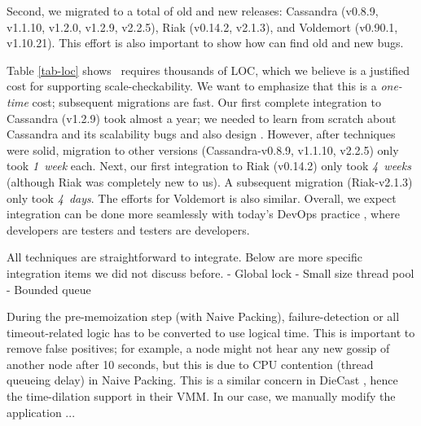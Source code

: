 Second, we migrated \sck to a total of \numVers old and new releases:
%
\numVersCass Cassandra (v0.8.9, v1.1.10, v1.2.0, v1.2.9, v2.2.5),
%
\numVersRiak Riak (v0.14.2, v2.1.3), and
%
\numVersVold Voldemort (v0.90.1, v1.10.21).
%
This effort is also important to show how \sck can find old and new
bugs. 



%
Table \ref{tab-loc} shows \sck\ requires thousands of LOC, which we
believe is a justified cost for supporting scale-checkability.  We want to
emphasize that this is a {\em one-time} cost; subsequent migrations are
fast.  Our first complete integration to Cassandra (v1.2.9) took almost a
year; we needed to learn from scratch about Cassandra and its scalability
bugs and also design \sck.  However, after \sck techniques were solid,
migration to other versions (Cassandra-v0.8.9, v1.1.10, v2.2.5) only took
{\em 1~week} each.  Next, our first integration to Riak (v0.14.2) only
took {\em 4~weeks} (although Riak was completely new to us).  A subsequent
migration (Riak-v2.1.3) only took {\em 4~days}.  The efforts for
Voldemort is also similar.
%
Overall, we expect \sck integration can be done more seamlessly with
today's DevOps practice \cite{Limoncelli+11-Devops}, where developers are
testers and testers are developers.







All \sck techniques are straightforward to integrate.  Below are more
specific integration items we did not discuss before.
- Global lock
- Small size thread pool
- Bounded queue
\fi

 During the pre-memoization step (with Naive
Packing), failure-detection or all timeout-related logic has to be
converted to use logical time.  This is important to remove false
positives; for example, a node might not hear any new gossip of another
node after 10 seconds, but this is due to CPU contention (thread queueing
delay) in Naive Packing.  This is a similar concern in DieCast \cite{x},
hence the time-dilation support in their VMM.  In our case, we manually
modify the application ... 
\fi









